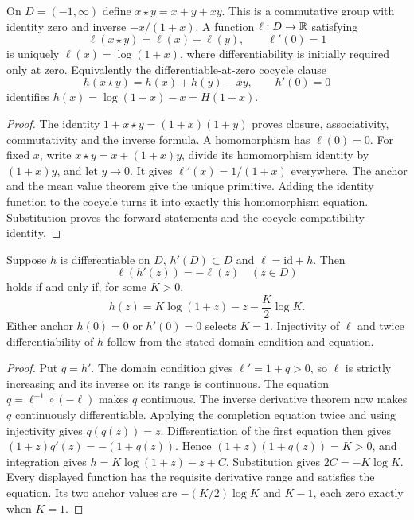 \begin{theorem}
\label{final:C3}
On $D=(-1,\infty)$ define $x\star y=x+y+xy$. This is a
commutative group with identity zero and inverse $-x/(1+x)$.
A function $\ell:D\to\mathbb R$ satisfying
\[
 \ell(x\star y)=\ell(x)+\ell(y),\qquad \ell'(0)=1
\]
is uniquely $\ell(x)=\log(1+x)$, where differentiability is
initially required only at zero. Equivalently the differentiable-at-zero
cocycle clause
\[
 h(x\star y)=h(x)+h(y)-xy,\qquad h'(0)=0
\]
identifies $h(x)=\log(1+x)-x=H(1+x)$.
\end{theorem}
\begin{proof}
The identity $1+x\star y=(1+x)(1+y)$ proves closure, associativity,
commutativity and the inverse formula. A homomorphism has $\ell(0)=0$.
For fixed $x$, write $x\star y=x+(1+x)y$, divide its homomorphism
identity by $(1+x)y$, and let $y\to0$. It gives
$\ell'(x)=1/(1+x)$ everywhere. The anchor and the mean value theorem
give the unique primitive. Adding the identity function to the cocycle
turns it into exactly this homomorphism equation. Substitution proves
the forward statements and the cocycle compatibility identity.
\end{proof}

\begin{theorem}
\label{final:C3-completion}
Suppose $h$ is differentiable on $D$, $h'(D)\subset D$ and
$\ell=\mathrm{id}+h$. Then
\[
 \ell(h'(z))=-\ell(z)\quad(z\in D)
\]
holds if and only if, for some $K>0$,
\[
 h(z)=K\log(1+z)-z-\frac K2\log K.
\]
Either anchor $h(0)=0$ or $h'(0)=0$ selects $K=1$.
Injectivity of $\ell$ and twice differentiability of $h$ follow from
the stated domain condition and equation.
\end{theorem}
\begin{proof}
Put $q=h'$. The domain condition gives $\ell'=1+q>0$, so
$\ell$ is strictly increasing and its inverse on its range is
continuous. The equation $q=\ell^{-1}\circ(-\ell)$ makes $q$
continuous. The inverse derivative theorem now makes $q$ continuously
differentiable. Applying the completion equation twice and using
injectivity gives $q(q(z))=z$. Differentiation of the first equation
then gives $(1+z)q'(z)=-(1+q(z))$. Hence
$(1+z)(1+q(z))=K>0$, and integration gives
$h=K\log(1+z)-z+C$. Substitution gives $2C=-K\log K$.
Every displayed function has the requisite derivative range and
satisfies the equation. Its two anchor values are
$-(K/2)\log K$ and $K-1$, each zero exactly when $K=1$.
\end{proof}

